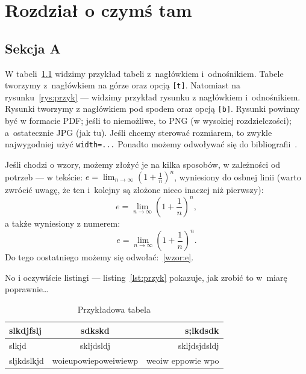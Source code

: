 
\chapter{Rozdział o czymś tam}

\section{Sekcja A}

W tabeli~\ref{tab:przyk} widzimy przykład tabeli z~nagłówkiem i~odnośnikiem. Tabele tworzymy z~nagłówkiem na górze oraz opcją \texttt{[t]}.
Natomiast na rysunku~\ref{rys:przyk} --- widzimy przykład rysunku z nagłówkiem i~odnośnikiem.
Rysunki tworzymy z nagłówkiem pod spodem oraz opcją \texttt{[b]}.
Rysunki powinny być w formacie PDF; jeśli to niemożliwe, to PNG (w wysokiej rozdzielczości); a~ostatecznie JPG (jak tu). Jeśli chcemy sterować rozmiarem, to zwykle najwygodniej użyć \texttt{width=...}
Ponadto możemy odwoływać się do bibliografii~\cite{a:doc, b:doc}.

Jeśli chodzi o wzory, możemy złożyć je na kilka sposobów, w zależności od potrzeb --- w tekście: $e=\lim_{n\to\infty}\left(1+\frac{1}{n}\right)^n$, wyniesiony do osbnej linii
(warto zwrócić uwagę, że ten i~kolejny są złożone nieco inaczej niż pierwszy):
\[e=\lim_{n\to\infty}\left(1+\frac{1}{n}\right)^n,\] a także wyniesiony z numerem:
\begin{equation}
    e=\lim_{n\to\infty}\left(1+\frac{1}{n}\right)^n.
    \label{wzor:e}
\end{equation}
Do tego oostatniego możemy się odwołać:~\eqref{wzor:e}.

No i oczywiście listingi --- listing~\ref{lst:przyk} pokazuje, jak zrobić to w~miarę poprawnie\ldots{}

\begin{table}[t]
    \begin{center}
        \caption{Przykładowa tabela}\label{tab:przyk}
        \begin{tabular}{l|c|r}
            slkdjfslj  & sdkskd               & s;lkdsdk          \\
            \hline
            slkjd      & skljdsldj            & skljdsjdsldj      \\
            sljkdslkjd & woieupowiepoweiwiewp & weoiw eppowie wpo \\
        \end{tabular}
    \end{center}
\end{table}

